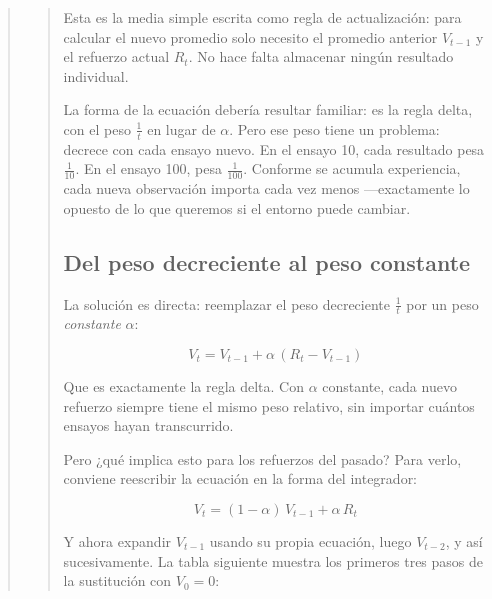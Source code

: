 \documentclass[
  letterpaper,
  DIV=11,
  numbers=noendperiod]{scrreprt}
\begin{document}
\begin{tcolorbox}[enhanced jigsaw, toprule=.15mm, arc=.35mm, colback=white, opacityback=0, colframe=quarto-callout-note-color-frame, breakable, rightrule=.15mm, left=2mm, leftrule=.75mm, bottomrule=.15mm]
\begin{quote}
\begin{quote}
Esta es la media simple escrita como regla de actualización: para
calcular el nuevo promedio solo necesito el promedio anterior
\(V_{t-1}\) y el refuerzo actual \(R_t\). No hace falta almacenar ningún
resultado individual.

La forma de la ecuación debería resultar familiar: es la regla delta,
con el peso \(\frac{1}{t}\) en lugar de \(\alpha\). Pero ese peso tiene
un problema: decrece con cada ensayo nuevo. En el ensayo 10, cada
resultado pesa \(\frac{1}{10}\). En el ensayo 100, pesa
\(\frac{1}{100}\). Conforme se acumula experiencia, cada nueva
observación importa cada vez menos ---exactamente lo opuesto de lo que
queremos si el entorno puede cambiar.

\subsection{Del peso decreciente al peso
constante}\label{del-peso-decreciente-al-peso-constante}

La solución es directa: reemplazar el peso decreciente \(\frac{1}{t}\)
por un peso \emph{constante} \(\alpha\):

\[V_t = V_{t-1} + \alpha\,(R_t - V_{t-1})\]

Que es exactamente la regla delta. Con \(\alpha\) constante, cada nuevo
refuerzo siempre tiene el mismo peso relativo, sin importar cuántos
ensayos hayan transcurrido.

Pero ¿qué implica esto para los refuerzos del pasado? Para verlo,
conviene reescribir la ecuación en la forma del integrador:

\[V_t = (1-\alpha)\,V_{t-1} + \alpha\,R_t\]

Y ahora expandir \(V_{t-1}\) usando su propia ecuación, luego
\(V_{t-2}\), y así sucesivamente. La tabla siguiente muestra los
primeros tres pasos de la sustitución con \(V_0 = 0\):


\end{quote}
\end{quote}
\end{tcolorbox}
\end{document}
